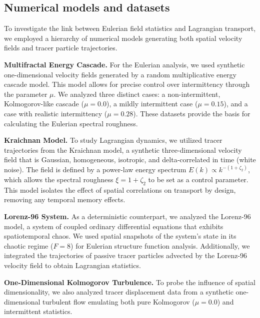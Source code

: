 \documentclass[]{article}
\begin{document}
\subsection{Numerical models and datasets}
To investigate the link between Eulerian field statistics and Lagrangian transport, we employed a hierarchy of numerical models generating both spatial velocity fields and tracer particle trajectories.

\noindent\textbf{Multifractal Energy Cascade.} For the Eulerian analysis, we used synthetic one-dimensional velocity fields generated by a random multiplicative energy cascade model. This model allows for precise control over intermittency through the parameter $\mu$. We analyzed three distinct cases: a non-intermittent, Kolmogorov-like cascade ($\mu=0.0$), a mildly intermittent case ($\mu=0.15$), and a case with realistic intermittency ($\mu=0.28$). These datasets provide the basis for calculating the Eulerian spectral roughness.

\noindent\textbf{Kraichnan Model.} To study Lagrangian dynamics, we utilized tracer trajectories from the Kraichnan model, a synthetic three-dimensional velocity field that is Gaussian, homogeneous, isotropic, and delta-correlated in time (white noise). The field is defined by a power-law energy spectrum $E(k) \propto k^{-(1+\zeta_2)}$, which allows the spectral roughness $\xi = 1 + \zeta_2$ to be set as a control parameter. This model isolates the effect of spatial correlations on transport by design, removing any temporal memory effects.

\noindent\textbf{Lorenz-96 System.} As a deterministic counterpart, we analyzed the Lorenz-96 model, a system of coupled ordinary differential equations that exhibits spatiotemporal chaos. We used spatial snapshots of the system's state in its chaotic regime ($F=8$) for Eulerian structure function analysis. Additionally, we integrated the trajectories of passive tracer particles advected by the Lorenz-96 velocity field to obtain Lagrangian statistics.

\noindent\textbf{One-Dimensional Kolmogorov Turbulence.} To probe the influence of spatial dimensionality, we also analyzed tracer displacement data from a synthetic one-dimensional turbulent flow emulating both pure Kolmogorov ($\mu=0.0$) and intermittent statistics.
\end{document}
